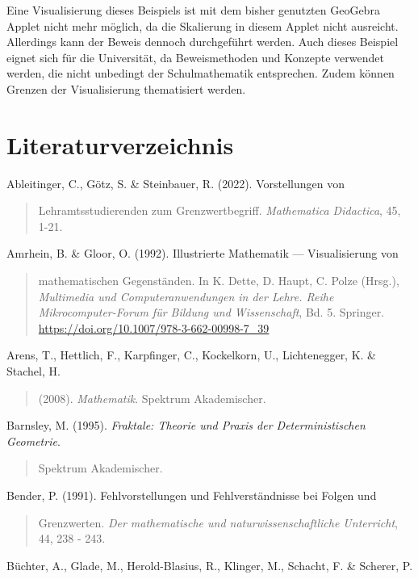 \documentclass[a4paper, 12pt]{book}
\begin{document}
Eine Visualisierung dieses Beispiels ist mit dem bisher genutzten
GeoGebra Applet nicht mehr möglich, da die Skalierung in diesem Applet
nicht ausreicht. Allerdings kann der Beweis dennoch durchgeführt werden.
Auch dieses Beispiel eignet sich für die Universität, da Beweismethoden
und Konzepte verwendet werden, die nicht unbedingt der Schulmathematik
entsprechen. Zudem können Grenzen der Visualisierung thematisiert
werden.


\chapter{Literaturverzeichnis}\label{literaturverzeichnis}

Ableitinger, C., Götz, S. \& Steinbauer, R. (2022). Vorstellungen von

\begin{quote}
Lehramtsstudierenden zum Grenzwertbegriff. \emph{Mathematica Didactica},
45, 1-21.
\end{quote}

Amrhein, B. \& Gloor, O. (1992). Illustrierte Mathematik ---
Visualisierung von

\begin{quote}
mathematischen Gegenständen. In K. Dette, D. Haupt, C. Polze (Hrsg.),
\emph{Multimedia und Computeranwendungen in der Lehre. Reihe
Mikrocomputer-Forum für Bildung und Wissenschaft}, Bd. 5. Springer.
\url{https://doi.org/10.1007/978-3-662-00998-7_39}
\end{quote}

Arens, T., Hettlich, F., Karpfinger, C., Kockelkorn, U., Lichtenegger,
K. \& Stachel, H.

\begin{quote}
(2008). \emph{Mathematik}. Spektrum Akademischer.
\end{quote}

Barnsley, M. (1995). \emph{Fraktale: Theorie und Praxis der
Deterministischen Geometrie}.

\begin{quote}
Spektrum Akademischer.
\end{quote}

Bender, P. (1991). Fehlvorstellungen und Fehlverständnisse bei Folgen
und

\begin{quote}
Grenzwerten. \emph{Der mathematische und naturwissenschaftliche
Unterricht}, 44, 238 - 243.
\end{quote}

Büchter, A., Glade, M., Herold-Blasius, R., Klinger, M., Schacht, F. \&
Scherer, P.
\end{document}
